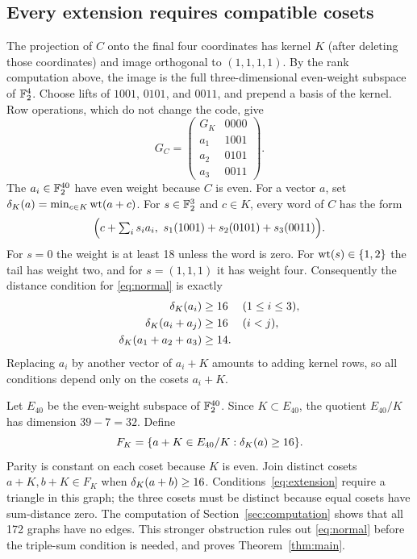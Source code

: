 \subsection{Every extension requires compatible cosets}
The projection of $C$ onto the final four coordinates has kernel $K$ (after deleting those coordinates) and image orthogonal to $(1,1,1,1)$. By the rank computation above, the image is the full three-dimensional even-weight subspace of $\mathbb F_2^4$. Choose lifts of $1001$, $0101$, and $0011$, and prepend a basis of the kernel. Row operations, which do not change the code, give
\begin{equation}\label{eq:normal}
 G_C=\begin{pmatrix}
 G_K&0000\\
 a_1&1001\\
 a_2&0101\\
 a_3&0011
 \end{pmatrix}.
\end{equation}
The $a_i\in\mathbb F_2^{40}$ have even weight because $C$ is even. For a vector $a$, set $\delta_K(a)=\min_{c\in K}\operatorname{wt}(a+c)$. For $s\in\mathbb F_2^3$ and $c\in K$, every word of $C$ has the form
\[
 \Bigl(c+\textstyle\sum_i s_ia_i,\ s_1(1001)+s_2(0101)+s_3(0011)\Bigr).
\]
For $s=0$ the weight is at least 18 unless the word is zero. For $\operatorname{wt}(s)\in\{1,2\}$ the tail has weight two, and for $s=(1,1,1)$ it has weight four. Consequently the distance condition for \eqref{eq:normal} is exactly
\begin{align}
 \delta_K(a_i)&\ge16 &&(1\le i\le3),\notag\\
 \delta_K(a_i+a_j)&\ge16 &&(i<j),\label{eq:extension}\\
 \delta_K(a_1+a_2+a_3)&\ge14.\notag
\end{align}
Replacing $a_i$ by another vector of $a_i+K$ amounts to adding kernel rows, so all conditions depend only on the cosets $a_i+K$.

Let $E_{40}$ be the even-weight subspace of $\mathbb F_2^{40}$. Since $K\subset E_{40}$, the quotient $E_{40}/K$ has dimension $39-7=32$. Define
\[
 F_K=\{a+K\in E_{40}/K:\delta_K(a)\ge16\}.
\]
Parity is constant on each coset because $K$ is even. Join distinct cosets $a+K,b+K\in F_K$ when $\delta_K(a+b)\ge16$. Conditions~\eqref{eq:extension} require a triangle in this graph; the three cosets must be distinct because equal cosets have sum-distance zero. The computation of Section~\ref{sec:computation} shows that all 172 graphs have no edges. This stronger obstruction rules out \eqref{eq:normal} before the triple-sum condition is needed, and proves Theorem~\ref{thm:main}.
